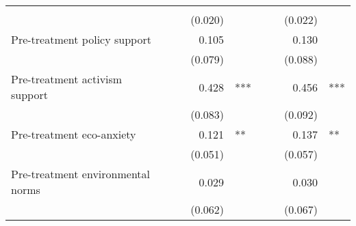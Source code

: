 \documentclass{article}
\begin{document}
\begin{table}[!h]
\begin{tabular}{lllllllll}
  \multicolumn{1}{l}{} \\
\multicolumn{1}{l}{} &
  \multicolumn{1}{r}{} &
  \multicolumn{1}{l}{} &
  \multicolumn{1}{r}{(0.020)} &
  \multicolumn{1}{l}{} &
  \multicolumn{1}{r}{} &
  \multicolumn{1}{l}{} &
  \multicolumn{1}{r}{(0.022)} &
  \multicolumn{1}{l}{} \\
\multicolumn{1}{l}{Pre-treatment policy support} &
  \multicolumn{1}{r}{} &
  \multicolumn{1}{l}{} &
  \multicolumn{1}{r}{0.105} &
  \multicolumn{1}{l}{} &
  \multicolumn{1}{r}{} &
  \multicolumn{1}{l}{} &
  \multicolumn{1}{r}{0.130} &
  \multicolumn{1}{l}{} \\
\multicolumn{1}{l}{} &
  \multicolumn{1}{r}{} &
  \multicolumn{1}{l}{} &
  \multicolumn{1}{r}{(0.079)} &
  \multicolumn{1}{l}{} &
  \multicolumn{1}{r}{} &
  \multicolumn{1}{l}{} &
  \multicolumn{1}{r}{(0.088)} &
  \multicolumn{1}{l}{} \\
\multicolumn{1}{l}{Pre-treatment activism support} &
  \multicolumn{1}{r}{} &
  \multicolumn{1}{l}{} &
  \multicolumn{1}{r}{0.428} &
  \multicolumn{1}{l}{***} &
  \multicolumn{1}{r}{} &
  \multicolumn{1}{l}{} &
  \multicolumn{1}{r}{0.456} &
  \multicolumn{1}{l}{***} \\
\multicolumn{1}{l}{} &
  \multicolumn{1}{r}{} &
  \multicolumn{1}{l}{} &
  \multicolumn{1}{r}{(0.083)} &
  \multicolumn{1}{l}{} &
  \multicolumn{1}{r}{} &
  \multicolumn{1}{l}{} &
  \multicolumn{1}{r}{(0.092)} &
  \multicolumn{1}{l}{} \\
\multicolumn{1}{l}{Pre-treatment eco-anxiety} &
  \multicolumn{1}{r}{} &
  \multicolumn{1}{l}{} &
  \multicolumn{1}{r}{0.121} &
  \multicolumn{1}{l}{**} &
  \multicolumn{1}{r}{} &
  \multicolumn{1}{l}{} &
  \multicolumn{1}{r}{0.137} &
  \multicolumn{1}{l}{**} \\
\multicolumn{1}{l}{} &
  \multicolumn{1}{r}{} &
  \multicolumn{1}{l}{} &
  \multicolumn{1}{r}{(0.051)} &
  \multicolumn{1}{l}{} &
  \multicolumn{1}{r}{} &
  \multicolumn{1}{l}{} &
  \multicolumn{1}{r}{(0.057)} &
  \multicolumn{1}{l}{} \\
\multicolumn{1}{l}{Pre-treatment environmental norms} &
  \multicolumn{1}{r}{} &
  \multicolumn{1}{l}{} &
  \multicolumn{1}{r}{0.029} &
  \multicolumn{1}{l}{} &
  \multicolumn{1}{r}{} &
  \multicolumn{1}{l}{} &
  \multicolumn{1}{r}{0.030} &
  \multicolumn{1}{l}{} \\
\multicolumn{1}{l}{} &
  \multicolumn{1}{r}{} &
  \multicolumn{1}{l}{} &
  \multicolumn{1}{r}{(0.062)} &
  \multicolumn{1}{l}{} &
  \multicolumn{1}{r}{} &
  \multicolumn{1}{l}{} &
  \multicolumn{1}{r}{(0.067)} &

\end{tabular}
\end{table}
\end{document}
